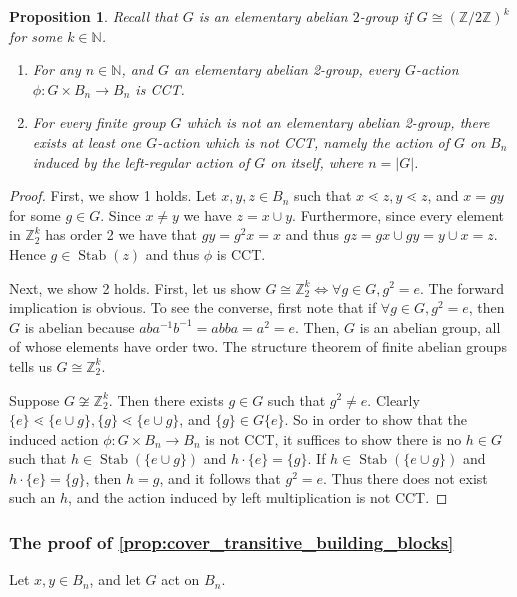 \documentclass[smallextended, envcountsame, numbook]{svjour3}
\theoremstyle{plain}
\newtheorem{prop}[thm]{Proposition}
\theoremstyle{definition}
\theoremstyle{remark}
\numberwithin{equation}{section}
\newcommand\sssec{\subsubsection}
\renewcommand{\iff}{\Leftrightarrow}
\newcommand\Stab{\operatorname{Stab}}
\begin{document}
\begin{prop}
\label{prop:regular_action_CCT}
Recall that $G$ is an elementary abelian $2$-group if $G \cong (\mathbb Z/2\mathbb Z)^k$ for some $k \in \mathbb N$.
\begin{enumerate}
  \item For any $n \in \mathbb N$, and $G$ an elementary abelian 2-group, every $G$-action $\phi:G \times B_n \rightarrow B_n$ is CCT.
  \item For every finite group $G$ which is not an elementary abelian 2-group, there exists at least one $G$-action which is not CCT, namely the action of $G$ on $B_n$ induced by the left-regular action of $G$ on itself, where $n = |G|$.
\end{enumerate}
\end{prop}

\begin{proof}
First, we show 1 holds. Let $x,y,z\in B_n$ such that $x \lessdot z, y \lessdot z$, and  $x = gy$ for some $g\in G$.  Since $x\ne y$ we have $z=x\cup y$.  Furthermore, since every element in $\mathbb Z_2^k$ has order 2 we have that $gy = g^2x = x$ and thus $gz = gx\cup gy = y\cup x = z$. Hence $g\in\Stab(z)$ and thus $\phi$ is CCT.

Next, we show 2 holds. First, let us show $G \cong \mathbb Z_2^k \iff \forall g \in G,g^2 = e$. The forward implication is obvious. To see the converse, first note that if $\forall g \in G, g^2 = e$, then $G$ is abelian because $aba^{-1}b^{-1} = abba = a^2 = e$.  Then, $G$ is an abelian group, all of whose elements have order two. The structure theorem of finite abelian groups tells us $G \cong \mathbb Z_2^k$.

Suppose $G \not \cong \mathbb Z_2^k$. Then there exists $g \in G$ such that $g^2 \neq e$. Clearly $\{e\}\lessdot \{e \cup g\},\{g\} \lessdot \{e \cup g\}$, and $\{g\} \in G\{e\}$. So in order to show that the induced action $\phi\colon G \times B_n \rightarrow B_n$ is not CCT, it suffices to show there is no $h \in G$ such that $h \in \Stab(\{e \cup g\})$ and $h\cdot \{e\} =\{g\}$.  If $h \in \Stab(\{e \cup g\})$ and $h \cdot \{e\} = \{g\}$, then $h = g$, and it follows that $g^2 = e$.  Thus there does not exist such an $h$, and the action induced by left multiplication is not CCT.
\end{proof}

\sssec{The proof of \ref{prop:cover_transitive_building_blocks}}
\label{sssec:dihedral}\indent 

Let $x, y \in B_n$, and let $G$ act on $B_n$. 
\building*
\end{document}
